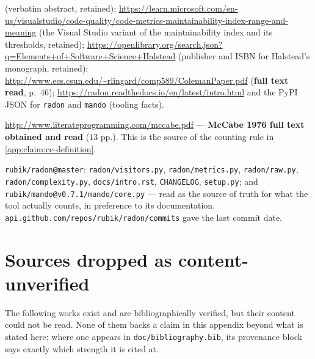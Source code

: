 \begin{description}
  (verbatim abstract, retained);
  \url{https://learn.microsoft.com/en-us/visualstudio/code-quality/code-metrics-maintainability-index-range-and-meaning}
  (the Visual Studio variant of the maintainability index and its
  thresholds, retained);
  \url{https://openlibrary.org/search.json?q=Elements+of+Software+Science+Halstead}
  (publisher and ISBN for Halstead's monograph, retained);
  \url{http://www.ecs.csun.edu/~rlingard/comp589/ColemanPaper.pdf}
  (\textbf{full text read}, p.~46);
  \url{https://radon.readthedocs.io/en/latest/intro.html} and the PyPI JSON
  for \texttt{radon} and \texttt{mando} (tooling facts).
\item[WebSearch then \texttt{curl}]
  \url{http://www.literateprogramming.com/mccabe.pdf} ---
  \textbf{McCabe 1976 full text obtained and read} (13 pp.).  This is the
  source of the counting rule in \cref{app:claim:cc-definition}.
\item[GitHub raw and API] \texttt{rubik/radon@master}:
  \texttt{radon/visitors.py}, \texttt{radon/metrics.py},
  \texttt{radon/raw.py}, \texttt{radon/complexity.py},
  \texttt{docs/intro.rst}, \texttt{CHANGELOG}, \texttt{setup.py}; and
  \texttt{rubik/mando@v0.7.1/mando/core.py} --- read as the source of truth
  for what the tool actually counts, in preference to its documentation.
  \nolinkurl{api.github.com/repos/rubik/radon/commits} gave the last commit
  date.
\end{description}

\section{Sources dropped as content-unverified}
\label{app:protocol:dropped}

The following works exist and are bibliographically verified, but their
content could not be read.  None of them backs a claim in this appendix
beyond what is stated here; where one appears in
\nolinkurl{doc/bibliography.bib}, its provenance block says exactly which
strength it is cited at.

